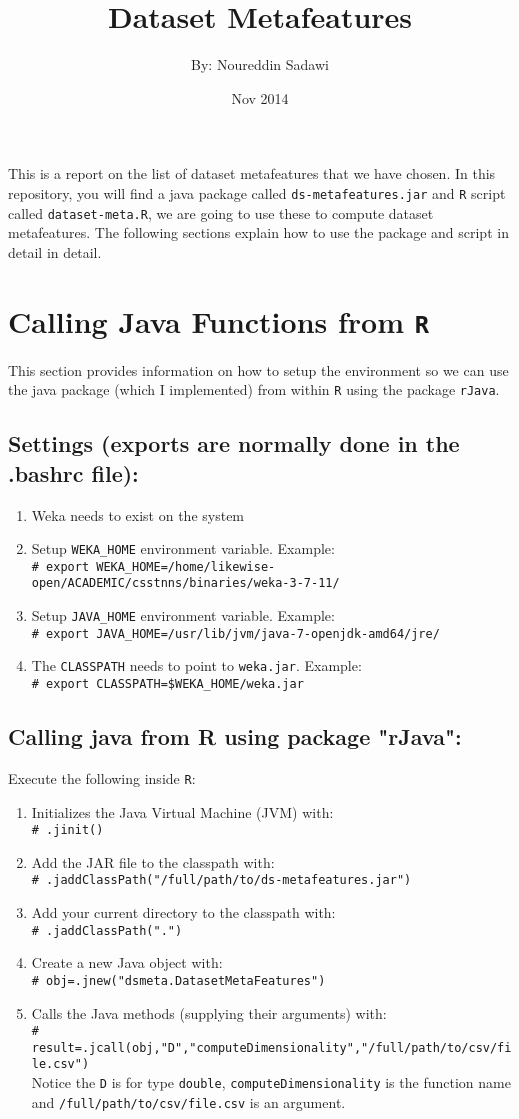\documentclass[a4paper,12pt, english]{article}
\newcommand{\shellcmd}[1]{\\\indent\indent\texttt{\footnotesize\# #1}\\}
\begin{document}
\title{Dataset Metafeatures}
\date{Nov 2014}
\author{By: Noureddin Sadawi}
\maketitle

\large
This is a report on the list of dataset metafeatures that we have chosen. In this repository, you will find a java package called \texttt{ds-metafeatures.jar} and \texttt{R} script called \texttt{dataset-meta.R}, we are going to use these to compute dataset metafeatures. The following sections explain how to use the package and script in detail in detail.
\section{Calling Java Functions from \texttt{R}}
This section provides information on how to setup the environment so we can use the java package (which I implemented) from within \texttt{R} using the package \texttt{rJava}.
\subsection{Settings (exports are normally done in the .bashrc file):}
\begin{enumerate}
	\item Weka needs to exist on the system
	\item Setup \texttt{WEKA\_HOME} environment variable. Example:
   	  \shellcmd{export WEKA\_HOME=/home/likewise-open/ACADEMIC/csstnns/binaries/weka-3-7-11/}

	\item Setup \texttt{JAVA\_HOME} environment variable. Example: 
	\shellcmd{export JAVA\_HOME=/usr/lib/jvm/java-7-openjdk-amd64/jre/}
	\item The \texttt{CLASSPATH} needs to point to \texttt{weka.jar}. Example:
	\shellcmd{export CLASSPATH=\$WEKA\_HOME/weka.jar}
\end{enumerate} 

\subsection{Calling java from R using package "rJava":}
Execute the following inside \texttt{R}:
\begin{enumerate}
	\item Initializes the Java Virtual Machine (JVM) with:\shellcmd{.jinit()}
	\item Add the JAR file to the classpath with:\shellcmd{.jaddClassPath("/full/path/to/ds-metafeatures.jar")}
	\item Add your current directory to the classpath with:\shellcmd{.jaddClassPath(".")}
	\item Create a new Java object with: \shellcmd{obj=.jnew("dsmeta.DatasetMetaFeatures")}
	\item Calls the Java methods (supplying their arguments) with:\shellcmd{result=.jcall(obj,"D","computeDimensionality","/full/path/to/csv/file.csv")}
	Notice the \texttt{D} is for type \texttt{double}, \texttt{computeDimensionality} is the function name and \texttt{/full/path/to/csv/file.csv} is an argument. 
\end{enumerate} 
\end{document}
